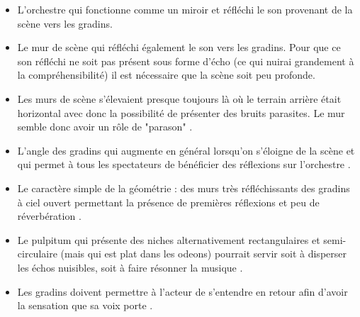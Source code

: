 \begin{itemize}
\item L'orchestre qui fonctionne comme un miroir et réfléchi le son provenant de la scène vers les gradins.
\item Le mur de scène qui réfléchi également le son vers les gradins. Pour que ce son réfléchi ne soit pas présent sous forme d'écho (ce qui nuirai grandement à la compréhensibilité) il est nécessaire que la scène soit peu profonde.
\item Les murs de scène s'élevaient presque toujours là où le terrain arrière était horizontal avec donc la possibilité de présenter des bruits parasites. Le mur semble donc avoir un rôle de "parason" \cite[p.38]{canac}.
\item L'angle des gradins qui augmente en général lorsqu'on s'éloigne de la scène et qui permet à tous les spectateurs de bénéficier des réflexions sur l'orchestre \cite[p.103-109]{canac}.
\item Le caractère simple de la géométrie : des murs très réfléchissants des gradins à ciel ouvert permettant la présence de premières réflexions et peu de réverbération \cite[p.33]{canac}.
\item Le \gls{pulpitum} qui présente des niches alternativement rectangulaires et semi-circulaire (mais qui est plat dans les \glspl{odeon}) pourrait servir soit à disperser les échos nuisibles, soit à faire résonner la musique \cite[p.38]{canac}.
\item Les gradins doivent permettre à l'acteur de s'entendre en retour afin d'avoir la sensation que sa voix porte \cite[p.42 - tab.II-4]{canac}.
\end{itemize}
